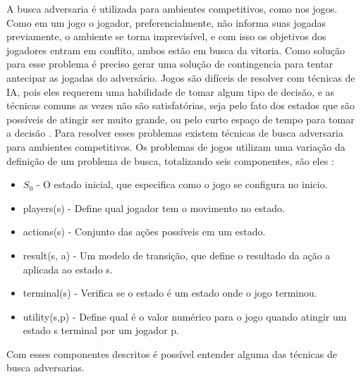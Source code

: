 A busca adversaria é utilizada para ambientes competitivos, como nos jogos. Como em um jogo o jogador, preferencialmente, não informa suas jogadas previamente, o ambiente se torna imprevisível, e com isso os objetivos dos jogadores entram em conflito, ambos estão em busca da vitoria. 
Como solução para esse problema é preciso gerar uma solução de contingencia para tentar antecipar as jogadas do adversário. 
Jogos são difíceis de resolver com técnicas de IA, pois eles requerem uma habilidade de tomar algum tipo de decisão, e as técnicas comuns as vezes não são satisfatórias, seja pelo fato dos estados que são possíveis de atingir ser muito grande, ou pelo curto espaço de tempo para tomar a decisão \cite{intelligence2003modern}. 
Para resolver esses problemas existem técnicas de busca adversaria para ambientes competitivos. Os problemas de jogos utilizam uma variação da definição de um problema de busca, totalizando seis componentes, são eles \cite{intelligence2003modern}:

\begin{itemize}
	\item $S_{0}$ - O estado inicial, que especifica como o jogo se configura no inicio.
	\item players(s) -  Define qual jogador tem o movimento no estado.
	\item actions(s) - Conjunto das ações possíveis em um estado.
	\item result(s, a) - Um modelo de transição, que define o resultado da ação a aplicada ao estado s.
	\item terminal(s) - Verifica se o estado é um estado onde o jogo terminou.
	\item utility(s,p) - Define qual é o valor numérico para o jogo quando atingir um estado s terminal por um jogador p. 
\end{itemize}

Com esses componentes descritos é possível entender alguma das técnicas de busca adversarias. 

